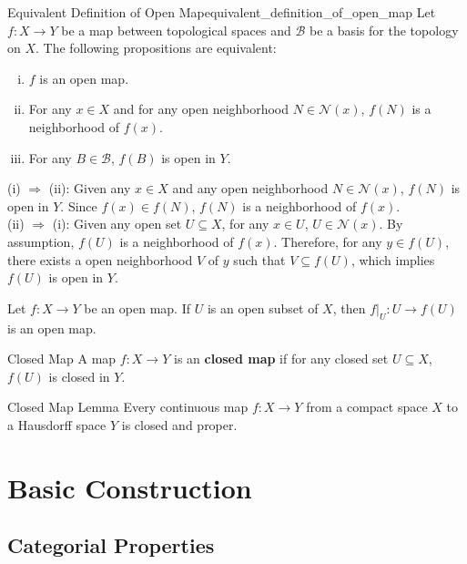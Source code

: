 \documentclass{report}
\begin{document}
\begin{proposition}{Equivalent Definition of Open Map}{equivalent_definition_of_open_map}
	Let $f:X\to Y$ be a map between topological spaces and $\mathcal{B}$ be a basis for the topology on $X$. The following propositions are equivalent:
	\begin{enumerate}[(i)]
		\item $f$ is an open map.
		\item For any $x\in X$ and for any open neighborhood $N\in\mathcal{N}(x)$, $f(N)$ is a neighborhood of $f(x)$.
		\item For any $B\in\mathcal{B}$, $f(B)$ is open in $Y$.
	\end{enumerate}
\end{proposition}
\begin{prf}
	(i) $\Rightarrow$ (ii): Given any $x\in X$ and any open neighborhood $N\in\mathcal{N}(x)$, $f(N)$ is open in $Y$. Since $f(x)\in f(N)$, $f(N)$ is a neighborhood of $f(x)$.\\
	(ii) $\Rightarrow$ (i): Given any open set $U\subseteq X$, for any $x\in U$, $U\in\mathcal{N}(x)$. By assumption, $f(U)$ is a neighborhood of $f(x)$. Therefore, for any $y\in f(U)$, there exists a open neighborhood $V$ of $y$ such that $V\subseteq f(U)$, which implies $f(U)$ is open in $Y$.
\end{prf}

\begin{proposition}{}{}
	Let $f:X\to Y$ be an open map. If $U$ is an open subset of $X$, then $f|_U:U\to f(U)$ is an open map.
\end{proposition}


\begin{definition}{Closed Map}{}
	A map $f:X\to Y$ is an \textbf{closed map} if for any closed set $U\subseteq X$, $f(U)$ is closed in $Y$.
\end{definition}

\begin{lemma}{Closed Map Lemma}{}
	Every continuous map $f: X \rightarrow Y$ from a compact space $X$ to a Hausdorff space $Y$ is closed and proper.
\end{lemma}

\section{Basic Construction}
\subsection{Categorial Properties}
\end{document}

